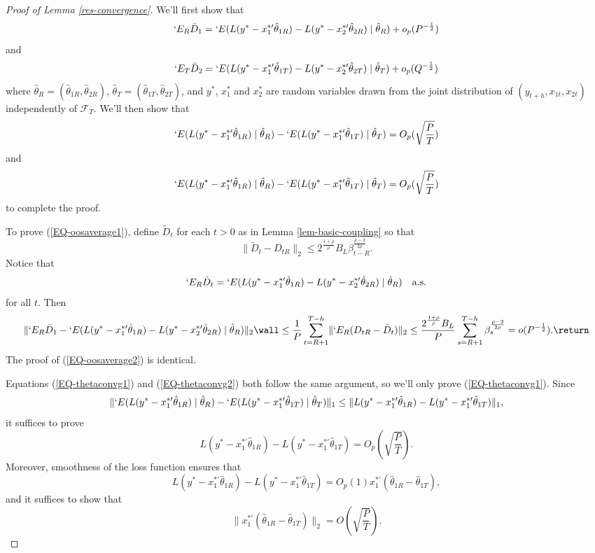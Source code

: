 \documentclass[11pt]{article}
\newcommand{\E}{`E}
\newcommand{\oosSum}[2]{\ensuremath{\sum_{#1=R+#2}^{T-\h}}}
\newcommand{\h}{h}
\newcommand{\couplingConstant}{\ensuremath{2^{\frac{1+\rho}{\rho}} B_L}}
\newcommand{\couplingBeta}[1]{\ensuremath{\beta^{\frac{\rho-2}{2\rho}}_{#1}}}
\newcommand{\couplingBound}[1]{\couplingConstant \couplingBeta{#1}}
\newcommand{\bh}[1]{\ensuremath{\hat\theta_{#1}}}
\begin{document}
\begin{proof}[Proof of Lemma \ref{res-convergence}]
\newcommand{\resConvgRHS}[1]{\ensuremath{\E(L(y^* - x_1^{*\prime}\bh{1#1}) - L(y^{*} -
x_2^{*\prime}\bh{2#1}) \mid \bh{#1})}}
\newcommand{\resConvgEstDiff}[1]{\ensuremath{\E(L(y^{*} -
    x_{#1}^{*\prime}\bh{#1R}) \mid \bh{R}) - 
\E(L(y^{*} - x_{#1}^{*\prime}\bh{#1T}) \mid \bh{T})}}
\newcommand{\resConvgEstDiffRV}[1]{\ensuremath{L(y^{*} -
    x_{#1}^{*\prime}\bh{#1R}) - L(y^{*} - x_{#1}^{*\prime}\bh{#1T})}}
We'll first show that 
\begin{equation}\label{EQ-oosaverage1}
\E_R \bar D_1 = \resConvgRHS{R} + o_p(P^{-\frac12})
\end{equation}
and
\begin{equation}\label{EQ-oosaverage2}
\E_T \bar D_2 = \resConvgRHS{T} + o_p(Q^{-\frac12})
\end{equation}
where $\hat\theta_R = (\hat\theta_{1R}, \hat\theta_{2R})$,
$\hat\theta_T = (\hat\theta_{1T}, \hat\theta_{2T})$, and $y^{*}$,
$x_1^{*}$ and $x_2^{*}$ are random variables drawn from the joint
distribution of $(y_{t+\h},x_{1t},x_{2t})$ independently of
$\mathcal{F}_T$.  We'll then show that
\begin{equation}\label{EQ-thetaconvg1}
\resConvgEstDiff{1} = O_p(\sqrt{\frac PT})
\end{equation}
and
\begin{equation}\label{EQ-thetaconvg2}
\resConvgEstDiff{1} = O_p(\sqrt{\frac PT})
\end{equation}
to complete the proof.

To prove (\ref{EQ-oosaverage1}), define $\tilde D_t$ for each $t > 0$ as
in Lemma \ref{lem-basic-coupling} so that
\[
\lVert \tilde D_t - D_{tR} \rVert_2 \leq \couplingBound{t-R}.
\]
Notice that 
\[
\E_R \tilde D_t = \resConvgRHS{R} \quad\text{a.s.}
\]
for all $t$.  Then 
\[
\lVert \E_R \bar D_1 - \resConvgRHS{R} \rVert_2 \wall 
\leq \frac1P \oosSum{t}{1} \lVert \E_R (D_{tR} - \tilde D_t) \rVert_2 \\
\leq \frac{\couplingConstant}{P} \oosSum{s}{1} \couplingBeta{s} \\
= o(P^{-\frac12}).
\return
\]
The proof of (\ref{EQ-oosaverage2}) is identical.

Equations (\ref{EQ-thetaconvg1}) and (\ref{EQ-thetaconvg2}) both
follow the same argument, so we'll only prove (\ref{EQ-thetaconvg1}).
Since 
\[ \lVert \resConvgEstDiff{1} \rVert_1 \leq \lVert
\resConvgEstDiffRV{1} \rVert_1, \]
it suffices to prove
\[ \resConvgEstDiffRV{1} = O_p(\sqrt{\frac PT}). \]
Moreover, smoothness of the loss function ensures that
\[ \resConvgEstDiffRV{1} = O_p(1) x_1^{*\prime} (\bh{1R} -
\bh{1T}), \]
and it suffices to show that
\begin{equation*}
  \lVert x_1^{*\prime}(\bh{1R} - \bh{1T}) \rVert_2 = O(\sqrt{\frac PT}).
\end{equation*}


\end{proof}
\end{document}
